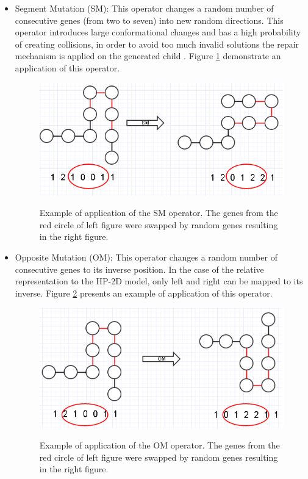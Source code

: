 \begin{itemize}
\begin{itemize}
		
		\item Segment Mutation (SM): This operator changes a random number of consecutive genes (from two to seven) into new random directions. This operator introduces large conformational changes and has a high probability of creating collisions, in order to avoid too much invalid solutions the repair mechanism is applied on the generated child \cite{custodio2014multiple}. Figure \ref{fig:operatorSM} demonstrate an application of this operator. 
		
		
			\begin{figure}[htb!]
				\includegraphics[scale=.4,frame]{figures/operators/SM.png}
				\centering
				\label{fig:operatorSM}
				\caption{Example of application of the SM operator. The genes from the red circle of left figure were swapped by random genes resulting in the right figure.} 
			\end{figure}
		

		
		\item Opposite Mutation (OM): This operator changes a random number of consecutive genes to its inverse position. In the case of the relative representation to the HP-2D model, only left and right can be mapped to its inverse. Figure \ref{fig:operatorOM} presents an example of application of this operator.
		
		
		
		\begin{figure}[htb!]
			\includegraphics[scale=.4,frame]{figures/operators/OM.png}
			\centering
			\label{fig:operatorOM}
			\caption{Example of application of the OM operator. The genes from the red circle of left figure were swapped by random genes resulting in the right figure.} 
		\end{figure}
		

\end{itemize}
\end{itemize}
